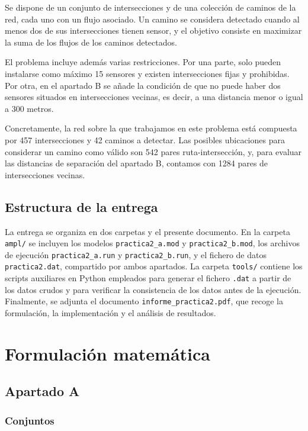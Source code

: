 \documentclass[12pt,a4paper]{article}
\begin{document}
Se dispone de un conjunto de intersecciones y de una colección de caminos de la red, cada uno con un flujo asociado. Un camino se considera detectado cuando al menos dos de sus intersecciones tienen sensor, y el objetivo consiste en maximizar la suma de los flujos de los caminos detectados.

El problema incluye además varias restricciones. Por una parte, solo pueden instalarse como máximo 15 sensores y existen intersecciones fijas y prohibidas. Por otra, en el apartado B se añade la condición de que no puede haber dos sensores situados en intersecciones vecinas, es decir, a una distancia menor o igual a 300 metros.

Concretamente, la red sobre la que trabajamos en este problema está compuesta por 457 intersecciones y 42 caminos a detectar. Las posibles ubicaciones para considerar un camino como válido son 542 pares ruta-intersección, y, para evaluar las distancias de separación del apartado B, contamos con 1284 pares de intersecciones vecinas.
\subsection{Estructura de la entrega}

La entrega se organiza en dos carpetas y el presente documento. En la carpeta \texttt{ampl/} se incluyen los modelos \texttt{practica2\_a.mod} y \texttt{practica2\_b.mod}, los archivos de ejecución \texttt{practica2\_a.run} y \texttt{practica2\_b.run}, y el fichero de datos \texttt{practica2.dat}, compartido por ambos apartados. La carpeta \texttt{tools/} contiene los scripts auxiliares en Python empleados para generar el fichero \texttt{.dat} a partir de los datos crudos y para verificar la consistencia de los datos antes de la ejecución. Finalmente, se adjunta el documento \texttt{informe\_practica2.pdf}, que recoge la formulación, la implementación y el análisis de resultados.

\section{Formulación matemática}

\subsection{Apartado A}

\subsubsection{Conjuntos}
\end{document}
